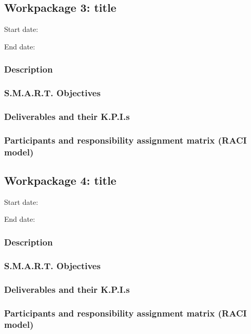 \subsection{Workpackage 3: title}
Start date:

End date:
\subsubsection{Description}
\subsubsection{S.M.A.R.T. Objectives}
\subsubsection{Deliverables and their K.P.I.s}
\subsubsection{Participants and responsibility assignment matrix (RACI model)}
\subsection{Workpackage 4: title}
Start date:

End date:
\subsubsection{Description}
\subsubsection{S.M.A.R.T. Objectives}
\subsubsection{Deliverables and their K.P.I.s}
\subsubsection{Participants and responsibility assignment matrix (RACI model)}


